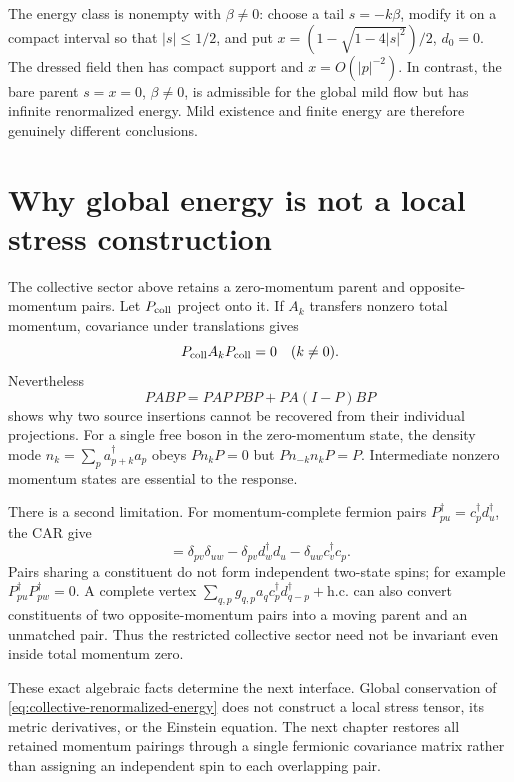 \documentclass[11pt,a4paper,oneside]{book}
\theoremstyle{plain}
\theoremstyle{definition}
\theoremstyle{remark}
\newcommand{\src}[2]{\cite{#1}}
\begin{document}
The energy class is nonempty with $\beta\ne0$: choose a tail
$s=-k\beta$, modify it on a compact interval so that $|s|\le1/2$, and
put $x=(1-\sqrt{1-4|s|^2})/2$, $d_0=0$.  The dressed field then has
compact support and $x=O(|p|^{-2})$.  In contrast, the bare parent
$s=x=0$, $\beta\ne0$, is admissible for the global mild flow but has
infinite renormalized energy.  Mild existence and finite energy are
therefore genuinely different conclusions.

\section{Why global energy is not a local stress construction}
\label{sec:collective-locality-obstruction}
The collective sector above retains a zero-momentum parent and
opposite-momentum pairs.  Let $P_{\rm coll}$ project onto it.  If
$A_k$ transfers nonzero total momentum, covariance under translations
gives
\begin{equation}
 P_{\rm coll}A_kP_{\rm coll}=0\quad(k\ne0).
 \label{eq:collective-momentum-projection}
\end{equation}
Nevertheless
\begin{equation}
 PABP=PAP\,PBP+PA(I-P)BP
 \label{eq:projected-two-source-defect}
\end{equation}
shows why two source insertions cannot be recovered from their
individual projections.  For a single free boson in the zero-momentum
state, the density mode $n_k=\sum_p a_{p+k}^\dagger a_p$ obeys
$Pn_kP=0$ but $Pn_{-k}n_kP=P$.  Intermediate nonzero momentum states
are essential to the response.

There is a second limitation.  For momentum-complete fermion pairs
$P_{pu}^\dagger=c_p^\dagger d_u^\dagger$, the CAR give
\begin{equation}
 [P_{pu},P_{vw}^\dagger]
 =\delta_{pv}\delta_{uw}-\delta_{pv}d_w^\dagger d_u
                              -\delta_{uw}c_v^\dagger c_p.
 \label{eq:overlapping-pair-algebra}
\end{equation}
Pairs sharing a constituent do not form independent two-state spins;
for example $P_{pu}^\dagger P_{pw}^\dagger=0$.  A complete vertex
$\sum_{q,p}g_{q,p}a_qc_p^\dagger d_{q-p}^\dagger+\mathrm{h.c.}$ can
also convert constituents of two opposite-momentum pairs into a moving
parent and an unmatched pair.  Thus the restricted collective sector
need not be invariant even inside total momentum zero.
\src{R20}{thm:v20v68-transfer,thm:v20v68-overlap}

These exact algebraic facts determine the next interface.  Global
conservation of \eqref{eq:collective-renormalized-energy} does not
construct a local stress tensor, its metric derivatives, or the
Einstein equation.  The next chapter restores all retained momentum
pairings through a single fermionic covariance matrix rather than
assigning an independent spin to each overlapping pair.
\end{document}
